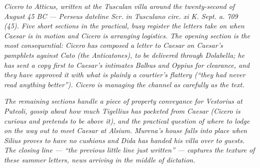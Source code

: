 
\textit{Cicero to Atticus, written at the Tusculan villa around the
twenty-second of August 45 BC --- Perseus dateline \textit{Scr.
in Tusculano circ. xi K. Sept. a. 709 (45)}. Five short sections
in the practical, busy register the letters take on when Caesar
is in motion and Cicero is arranging logistics. The opening
section is the most consequential: Cicero has composed a letter
to Caesar on Caesar's pamphlets against Cato (the
\textit{Anticatones}), to be delivered through Dolabella; he has
sent a copy first to Caesar's intimates Balbus and Oppius for
clearance, and they have approved it with what is plainly a
courtier's flattery (``they had never read anything better'').
Cicero is managing the channel as carefully as the text.}

\textit{The remaining sections handle a piece of property
conveyance for Vestorius at Puteoli, gossip about how much
Tigellius has pocketed from Caesar (Cicero is curious and
pretends to be above it), and the practical question of where to
lodge on the way out to meet Caesar at Alsium. Murena's house
falls into place when Silius proves to have no cushions and Dida
has handed his villa over to guests. The closing line ---
``\textit{the previous little line just written}'' --- captures
the texture of these summer letters, news arriving in the middle
of dictation.}
